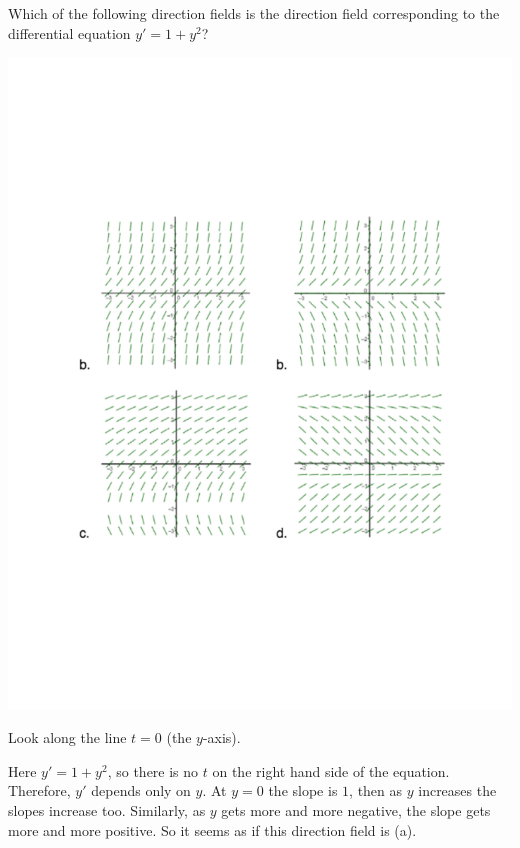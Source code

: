 \documentclass[noinstructornotes]{ximera}
\begin{document}
\begin{problem}
Which of the following direction fields is the direction field corresponding to the differential equation $y' = 1+y^2$?

	
	\begin{image}
	\includegraphics[trim= 250 200 250 200,scale=0.8]{Figure8-2-3.pdf}
	\end{image}
	
	\begin{freeResponse}
	Look along the line $t=0$ (the $y$-axis).

	Here $y' = 1+y^2$, so there is no $t$ on the right hand side of the equation.  
	Therefore, $y'$ depends only on $y$.  
	At $y=0$ the slope is $1$, then as $y$ increases the slopes increase too.  
	Similarly, as $y$ gets more and more negative, the slope gets more and more positive.  
	So it seems as if this direction field is (a).

	\end{freeResponse}

\end{problem}
\end{document}

